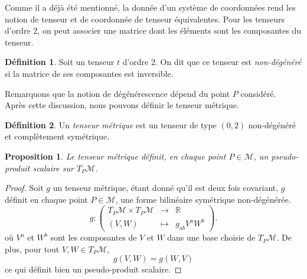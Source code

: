 \documentclass[a4paper,11pt]{report}
\theoremstyle{definition}
\theoremstyle{plain}
\newtheorem{prop}[thm]{Proposition}
\theoremstyle{definition}
\newtheorem{defn}{Définition}[chapter]
\theoremstyle{remark}
\newcommand{\M}{\mathscr{M}}
\begin{document}
                Comme il a déjà été mentionné, la donnée d'un système de coordonnées rend les notion de tenseur et de coordonnée de tenseur équivalentes. Pour les tenseurs d'ordre $2$, on peut associer une matrice dont les éléments sont les composantes du tenseur.
                
                \begin{defn}
                    Soit un tenseur $t$ d'ordre $2$. On dit que ce tenseur est \textit{non-dégénéré} si la matrice de ses composantes est inversible.
                \end{defn}
                
                Remarquons que la notion de dégénérescence dépend du point $P$ considéré.\\
                Après cette discussion, nous pouvons définir le tenseur métrique.
                
                \begin{defn}
                    Un \textit{tenseur métrique} est un tenseur de type $(0,2)$ non-dégénéré et complètement symétrique.
                \end{defn}
                
                \begin{prop}
                    Le tenseur métrique définit, en chaque point $P\in\M$, un pseudo-produit scalaire sur $T_P\M$.
                \end{prop}
                
                \begin{proof}
                    Soit $g$ un tenseur métrique, étant donné qu'il est deux fois covariant, $g$ définit en chaque point $P\in\M$, une forme bilinéaire symétrique non-dégénérée.
                \begin{equation}
                    g:\left(
                \begin{array}{ccc}
                    T_P\M\times T_P\M & \longrightarrow & \mathbb{R} \\
                    (V,W) & \longmapsto & g_{ab}V^a W^b
                \end{array}
                \right).
                \end{equation}
                où $V^a$ et $W^b$ sont les composantes de $V$ et $W$ dans une base choisie de $T_P\M$. De plus, pour tout $V,W\in T_P\M$,
                \begin{equation}
                    g(V,W) = g(W,V)
                \end{equation}
                ce qui définit bien un pseudo-produit scalaire.
                \end{proof}
                
\end{document}
